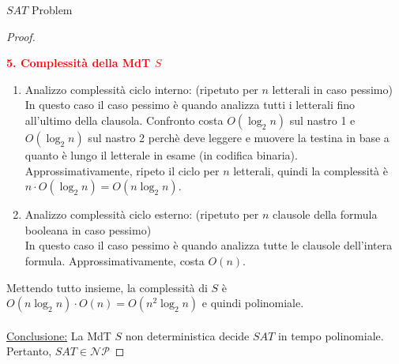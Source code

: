 \documentclass{article}  %
\theoremstyle{definition}
\begin{document}
\begin{theorem}{$SAT$ Problem}
\begin{proof}
\begin{enumerate}
		\end{enumerate}
		\textbf{\textcolor{red}{5. Complessità della MdT $S$}}
		\begin{enumerate}
			\item Analizzo complessità ciclo interno: (ripetuto per $n$ letterali in caso pessimo) \\
			      In questo caso il caso pessimo è quando analizza tutti i letterali fino all'ultimo della clausola.
			      Confronto costa $O(\log_2n)$ sul nastro 1 e $O(\log_2n)$ sul nastro 2 perchè deve leggere e muovere la testina in base a quanto è lungo il letterale in esame (in codifica binaria). \\
			      Approssimativamente, ripeto il ciclo per $n$ letterali, quindi la complessità è $n \cdot O(\log_2n) = O(n \log_2n)$.
			\item Analizzo complessità ciclo esterno: (ripetuto per $n$ clausole della formula booleana in caso pessimo) \\
			      In questo caso il caso pessimo è quando analizza tutte le clausole dell'intera formula.
			      Approssimativamente, costa $O(n)$.
		\end{enumerate}
		Mettendo tutto insieme, la complessità di $S$ è $O(n \log_2n) \cdot O(n)=O(n^2 \log_2n)$ e quindi polinomiale. \\ \\
		\underline{Conclusione:} La MdT $S$ non deterministica decide $SAT$ in tempo polinomiale. Pertanto, $SAT \in \mathcal{NP}$
	\end{proof}
\end{theorem}
\end{document}
